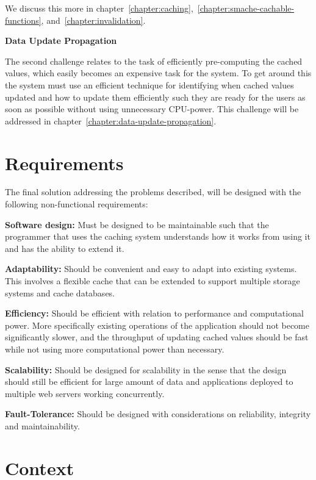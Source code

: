 We discuss this more in chapter~\ref{chapter:caching},~\ref{chapter:smache-cachable-functions}, and~\ref{chapter:invalidation}.

\textbf{Data Update Propagation}

The second challenge relates to the task of efficiently pre-computing the cached values, which easily becomes an expensive task for the system. To get around this the system must use an efficient technique for identifying when cached values updated and how to update them efficiently such they are ready for the users as soon as possible without using unnecessary CPU-power. This challenge will be addressed in chapter~\ref{chapter:data-update-propagation}.


\section{Requirements}
\label{sec:requirements}

The final solution addressing the problems described, will be designed with the following non-functional requirements:

\textbf{Software design:} Must be designed to be maintainable such that the programmer that uses the caching system understands how it works from using it and has the ability to extend it.

\textbf{Adaptability:} Should be convenient and easy to adapt into existing systems. This involves a flexible cache that can be extended to support multiple storage systems and cache databases.

\textbf{Efficiency:} Should be efficient with relation to performance and computational power. More specifically existing operations of the application should not become significantly slower, and the throughput of updating cached values should be fast while not using more computational power than necessary.

\textbf{Scalability:} Should be designed for scalability in the sense that the design should still be efficient for large amount of data and applications deployed to multiple web servers working concurrently.

\textbf{Fault-Tolerance:} Should be designed with considerations on reliability, integrity and maintainability.


\section{Context}
\label{sec:context}

